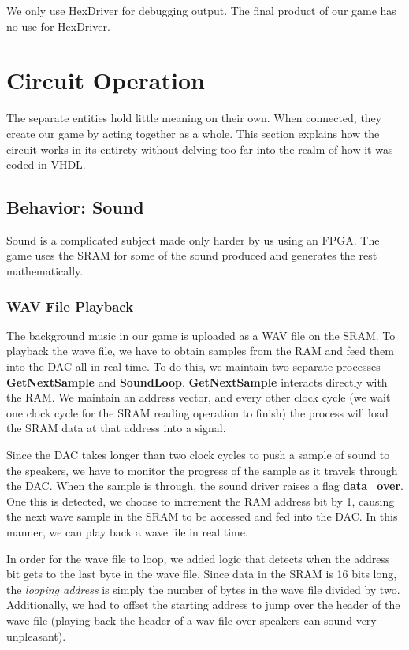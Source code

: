 \documentclass[10pt,a4paper]{article}
\begin{document}
We only use HexDriver for debugging output. The final product of our game has no use for HexDriver.

\section{Circuit Operation}
The separate entities hold little meaning on their own. When connected, they create our game by acting together as a whole. This section explains how the circuit works in its entirety without delving too far into the realm of how it was coded in VHDL.

\subsection{Behavior: Sound}
Sound is a complicated subject made only harder by us using an FPGA. The game uses the SRAM for some of the sound produced and generates the rest mathematically.

\subsubsection{WAV File Playback}
The background music in our game is uploaded as a WAV file on the SRAM. To playback the wave file, we have to obtain samples from the RAM and feed them into the DAC all in real time. To do this, we maintain two separate processes \textbf{GetNextSample} and\textbf{ SoundLoop}. \textbf{GetNextSample} interacts directly with the RAM. We maintain an address vector, and every other clock cycle (we wait one clock cycle for the SRAM reading operation to finish) the process will load the SRAM data at that address into a signal.

Since the DAC takes longer than two clock cycles to push a sample of sound to the speakers, we have to monitor the progress of the sample as it travels through the DAC. When the sample is through, the sound driver raises a flag \textbf{data\_over}. One this is detected, we choose to increment the RAM address bit by 1, causing the next wave sample in the SRAM to be accessed and fed into the DAC. In this manner, we can play back a wave file in real time.

In order for the wave file to loop, we added logic that detects when the address bit gets to the last byte in the wave file. Since data in the SRAM is 16 bits long, the \textit{looping address} is simply the number of bytes in the wave file divided by two. Additionally, we had to offset the starting address to jump over the header of the wave file (playing back the header of a wav file over speakers can sound very unpleasant).
\end{document}
